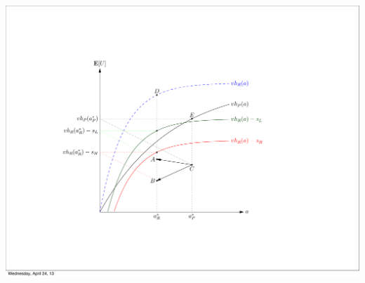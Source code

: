 \documentclass[12pt]{beamer}
\begin{document}
\begin{frame}{}
\begin{animateinline}[autoplay]{10}
\begin{minipage}{\textwidth}
\includegraphics[trim=5cm 5.8cm 3cm 5cm,clip=true,width=140mm]{present_pdf1.pdf}

\vspace{\textheight}

\end{minipage}
\end{animateinline}
\end{frame}

\begin{frame}{}
\begin{animateinline}[autoplay]{10}
\end{animateinline}
\end{frame}
\end{document}
